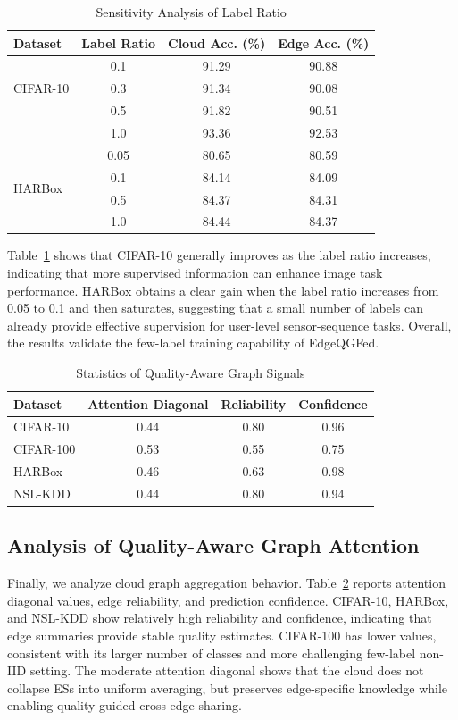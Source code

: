 ﻿\documentclass[10pt, conference, letterpaper]{ IEEEtran}
\begin{document}
\begin{table}[t]
\centering
\caption{Sensitivity Analysis of Label Ratio}
\label{tab:sensitivity}
\begin{tabular}{lccc}
\toprule
Dataset & Label Ratio & Cloud Acc. (\%) & Edge Acc. (\%) \\
\midrule
\multirow{3}{*}{CIFAR-10} & 0.1 & 91.29 & 90.88 \\
 & 0.3 & 91.34 & 90.08 \\
 & 0.5 & 91.82 & 90.51 \\
 & 1.0 & 93.36 & 92.53 \\
 \midrule
\multirow{4}{*}{HARBox}  & 0.05 & 80.65 & 80.59 \\
 & 0.1 & 84.14 & 84.09 \\
 & 0.5 & 84.37 & 84.31 \\
 & 1.0 & 84.44 & 84.37 \\
\bottomrule
\end{tabular}
\end{table}

Table~\ref{tab:sensitivity} shows that CIFAR-10 generally improves as the label ratio increases, indicating that more supervised information can enhance image task performance. HARBox obtains a clear gain when the label ratio increases from 0.05 to 0.1 and then saturates, suggesting that a small number of labels can already provide effective supervision for user-level sensor-sequence tasks. Overall, the results validate the few-label training capability of EdgeQGFed.

\begin{table}[t]
\centering
\caption{Statistics of Quality-Aware Graph Signals}
\label{tab:graph_signal}
\begin{tabular}{lccc}
\toprule
Dataset & Attention Diagonal & Reliability & Confidence \\
\midrule
CIFAR-10 & 0.44 & 0.80 & 0.96\\
CIFAR-100 & 0.53 & 0.55 & 0.75\\
HARBox & 0.46 & 0.63 & 0.98  \\
NSL-KDD & 0.44 & 0.80 & 0.94 \\
\bottomrule
\end{tabular}
\end{table}
\subsection{Analysis of Quality-Aware Graph Attention}
\label{subsec:graph_analysis}
Finally, we analyze cloud graph aggregation behavior. Table~\ref{tab:graph_signal} reports attention diagonal values, edge reliability, and prediction confidence. CIFAR-10, HARBox, and NSL-KDD show relatively high reliability and confidence, indicating that edge summaries provide stable quality estimates. CIFAR-100 has lower values, consistent with its larger number of classes and more challenging few-label non-IID setting. The moderate attention diagonal shows that the cloud does not collapse ESs into uniform averaging, but preserves edge-specific knowledge while enabling quality-guided cross-edge sharing.
\end{document}
